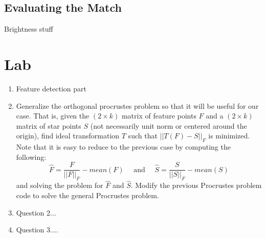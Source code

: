 \documentclass[paper=a4, fontsize=11pt]{scrartcl} %
\begin{document}
\subsection{Evaluating the Match}

Brightness stuff

\section{Lab}

\begin{enumerate}
  \item Feature detection part
  \item
  Generalize the orthogonal procrustes problem so that it will be useful for our case. That is, given the $(2\times k)$ matrix of feature points $F$ and a  $(2\times k)$ matrix of star points $S$ (not necessarily unit norm or centered around the origin), find ideal transformation $T$ such that $||T(F)-S||_F$ is minimized.  Note that it is easy to reduce to the previous case by computing the following:
  $$
  \hat{F} = \frac{F}{||F||_F} - mean(F)\quad\textrm{ and }\quad\hat{S} = \frac{S}{||S||_F} - mean(S)
  $$
  and solving the problem for $\hat{F}$ and $\hat{S}$. Modify the previous Procrustes problem code to solve the general Procrustes problem.
  \item Question 2...
  \item Question 3....
\end{enumerate}
\end{document}
